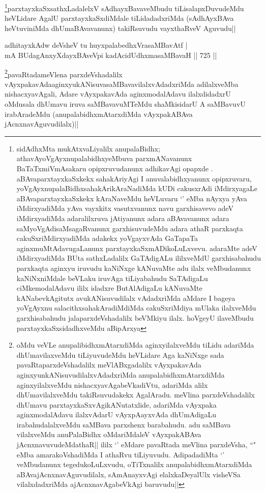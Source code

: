 \begin{artha}
\footnote{sidAdhxMta mukAtxvaLiyalilx anupalaBidhx; athavAyoVgAyxnupalabidhxyeMbuva parxmANavanunx BaTaTxmiVmAsakaru opipxruvudanunx adhikavAgi opapxde . aBAvaparxtayxkaSxkekx sahakAriyAgi I anuvalabidhxyanunx opipxruvaru, yoVgAyxnupalaBidhxsahakArikAraNadiMda kUDi cakusxrAdi iMdirxyagaLe aBAvaparxtayxkaSxkekx  kAraNaveMdu heVLuvaru `\stext' eMba nAyxya yAva iMdirxyadiMda yAva vayxkitx vasutxvanunx navu garxhisavevo adeV iMdirxyadiMda adaralilxruva jAtiyanunx adara aBAvavanunx adara saMyoVgAdisaMsagaRvanunx garxhisuvudeMdu adara athaR parxkaqta cakuSxriMdirxyadiMda adakekx yoVgayxvAda GaTapaTa aginxmuMtAdavugaLanunx parxtayxkaSxmADikoLuLxvevu. adaraMte adeV iMdirxyadiMda BUta sathxLadalilx GaTAdigALu ililxveMdU garxhisabahudu parxkaqta aginxyu iruvudu kaNiNxge kANuvaMte adu ilalx veMbudanunx kaNiNxniMdale beVLaku iruvAga tiLiyabahudu  SaTAdigaLu ciMkemodalAdavu ililx idadxre ButAlAdigaLu kANuvaMte kANabevkAgitutx avukANisuvudilalx vAdadxriMda aMdare I bageya yoVgAyxnu salacithxsahakAradiMdiMda cakuSxriMdiya mUlaka ilalxveMdu garxhisabahudu jalaparxdeVshadalilx beVMkiyu ilalx. hoVgeyU ilaveMbudu parxtayxkaSxsidadhxveMdu aBipArxya}parxtayxkaSxsathxLadalelxV sAdhayxBavaveMbudu tiLisalapxDuvudeMdu heVLidare AgalU parxtayxkaSxdiMdale tiLidadadxriMda (sAdhAyxBAva heVtuviniMda dhUmaBAvavanunx) takiRsuvudu vayxthaRveV Aguvudu||
\end{artha}

\begin{shl}
adhitayxkAdw deVsheV tu huyxpalabedhxVrasaMBavAtf | \\
mA BUdagAnxyXdayxBAveV\s pi kadAcidUdhxmasaMBavaH \hfill||  725 ||  
\end{shl}

\begin{artha}
\footnote{oMdu veVLe anupalibidhxmAtarxdiMda aginxyilalxveMdu tiLidu adariMda dhUmavilaxveMdu tiLiyuvudeMdu heVLidare Aga kaNiNxge sada pavaRtaparxdeVshadalilx meVlABxgadalilx vAyxpakavAda aginxyunkANisuvudilalxvAdadxriMda anupalabidhxmAtarxdiMda aginxyilalxveMdu nishacxyavAgabeVkadiVtu, adariMda alilx dhUmavilalxveMdu takiRsuvudakekx AgalAradu.  meVlina parxdeVshadalilx dhUmavu parxtayxkaSxvAgikANutatxlide,  adariMda vAyxpaka aginxmodalAdavu ilalxvAdarU vAyxpAayxvAda dhUmAdigaLu irabahudalalxveMdu saMBava parxshenx barabahudu. adu saMBava vilalxveMdu anuPalaBidhx oMdariMdaleV vAyxpakABAva jAcnxnavuvudeMdathaR|| ililx `\stext' eMdare pavaRtada meVlina parxdeVsha, ``\stext" eMba amarakoVshadiMda I athaRvu tiLiyuvudu. AdipadadiMta `\stext' veMbudanunx tegedukoLuLxvudu, oTiTxnalilx anupalabidhxmAtarxdiMda aBAvajAcnxnavAguvudilalx, sAmAnayxvAgi elalxkaDeyalUlx visheVSa vilalxdadxriMda ajAcnxnavAgabeVkAgi baruvudu||}pavaRtadameVlena parxdeVshadalilx vAyxpakavAdaaginxyukANisuvasaMBavavilalxvAdadxriMda adilalxveMba nishacxyavAgali, Adare vAyxpakavAda aginxmodalAdavu ilalxdidadxrU oMdusala dhUmavu iruva saMBavavuMTeMdu shaMkisidarU A saMBavuvU irabAradeMdu (anupalabidhxmAtarxdiMda vAyxpakABAva jAcnxnavAguvudilalx)||
\end{artha}

